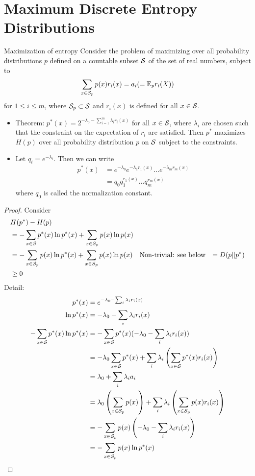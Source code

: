 \documentclass[../main.tex]{subfiles}
\begin{document}
\section{Maximum Discrete Entropy Distributions}
\begin{bbox}{Maximization of entropy}
    Consider the problem of maximizing over all probability distributions $p$ defined on a countable subset $\S$ of the set of real numbers, subject to \[
    \sum_{x\in\S_p}p(x)r_i(x) = a_i (=\bE_p r_i(X))
    \] for $1\leq i\leq m$, where $\S_p\subset \S$ and $r_i(x)$ is defined for all $x\in \S$.
    \begin{itemize}
        \item Theorem: $p^*(x) = 2^{-\lambda_0 - \sum_{i=1}^m\lambda_i r_i(x)}$ for all $x\in \S$, where $\lambda_i$ are chosen such that the constraint on the expectation of $r_i$ are satisfied. Then $p^*$ maximizes $H(p)$ over all probability distribution $p$ on $\S$ subject to the constraints.
        \item Let $q_i=e^{-\lambda_i}$. Then we can write \begin{align*}
            p^*(x) &= e^{-\lambda_0} e^{-\lambda_1r_1(x)}\dots e^{-\lambda_m r_m(x)}\\
            &= q_0 q_1^{r_1(x)}\dots q_m^{r_m(x)}
        \end{align*}
        where $q_0$ is called the normalization constant.
    \end{itemize}
    \begin{proof}
        Consider \begin{align*}
            &\H(p^*) - H(p)\\
            &=-\sum_{x\in\S}p^*(x)\ln p^*(x) + \sum_{x\in S_p}p(x)\ln p(x)\\
            &= -\sum_{x\in\S_p}p(x)\ln p^*(x) + \sum_{x\in S_p}p(x)\ln p(x) \quad \text{Non-trivial: see below}
            &= D(p||p^*)\\
            &\geq 0
        \end{align*}
        Detail: 
        \begin{align*}
            p^*(x) &= e^{-\lambda_0-\sum_i\lambda_i r_i(x)}\\
            \ln p^*(x) &= -\lambda_0 - \sum_i\lambda_i r_i(x)\\
            -\sum_{x\in \S}p^*(x)\ln p^*(x)
            &=-\sum_{x\in \S}p^*(x)(-\lambda_0 - \sum_i\lambda_i r_i(x)) \\
            &= -\lambda_0\sum_{x\in \S}p^*(x) + \sum_i\lambda_i \left(\sum_{x\in \S}p^*(x)r_i(x)\right)\\
            &= \lambda_0 + \sum_i\lambda_i a_i \\
            &= \lambda_0 \left(\sum_{x\in \S_p}p(x)\right) + \sum_i\lambda_i\left(\sum_{x\in\S_p}p(x)r_i(x)\right) \\
            &= -\sum_{x\in \S_p}p(x)\left(-\lambda_0 - \sum_i\lambda_i r_i(x)\right)\\
            &= -\sum_{x\in \S_p}p(x)\ln p^*(x)
        \end{align*}
    \end{proof}
\end{bbox}
\end{document}
